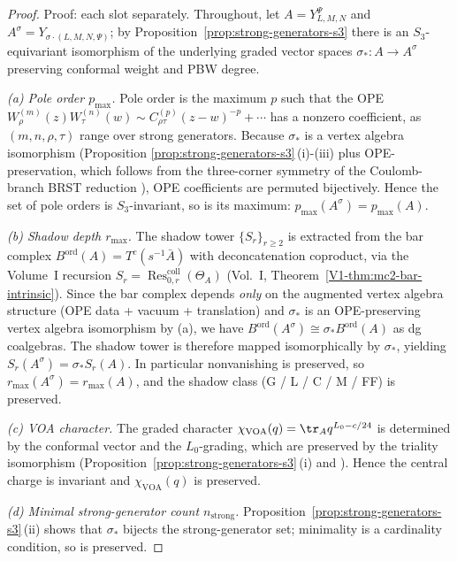 \begin{proof}
Proof: each slot separately. Throughout, let
$A = Y_{L,M,N}^\Psi$ and
$A^\sigma = Y_{\sigma\cdot(L,M,N,\Psi)}$;
by Proposition~\ref{prop:strong-generators-s3} there is an
$S_3$-equivariant isomorphism of the underlying graded vector spaces
$\sigma_*: A \to A^\sigma$ preserving conformal weight and PBW
degree.

\smallskip
\emph{(a) Pole order $p_{\max}$.} Pole order is the maximum
$p$ such that the OPE $W^{(m)}_\rho(z) W^{(n)}_\tau(w) \sim
C_{\rho\tau}^{(p)} (z-w)^{-p} + \dotsb$ has a nonzero coefficient, as
$(m, n, \rho, \tau)$ range over strong generators. Because
$\sigma_*$ is a vertex algebra isomorphism (Proposition
\ref{prop:strong-generators-s3}\,(i)-(iii) plus OPE-preservation, which
follows from the three-corner symmetry of the Coulomb-branch BRST
reduction \cite[\S5]{ProchazkRapcak2018}), OPE coefficients are
permuted bijectively. Hence the set of pole orders is
$S_3$-invariant, so is its maximum: $p_{\max}(A^\sigma) = p_{\max}(A)$.

\smallskip
\emph{(b) Shadow depth $r_{\max}$.} The shadow tower
$\{S_r\}_{r \ge 2}$ is extracted from the bar complex
$B^{\mathrm{ord}}(A) = T^c(s^{-1}\bar A)$ with deconcatenation
coproduct, via the Volume~I recursion
$S_r = \operatorname{Res}^{\mathrm{coll}}_{0,r}(\Theta_A)$
(Vol.~I, Theorem~\ref*{V1-thm:mc2-bar-intrinsic}). Since the bar
complex depends \emph{only} on the augmented vertex algebra
structure (OPE data + vacuum + translation) and $\sigma_*$ is an
OPE-preserving vertex algebra isomorphism by (a), we have
$B^{\mathrm{ord}}(A^\sigma) \cong \sigma_* B^{\mathrm{ord}}(A)$
as dg coalgebras. The shadow tower is therefore mapped isomorphically
by $\sigma_*$, yielding $S_r(A^\sigma) = \sigma_* S_r(A)$. In
particular nonvanishing is preserved, so
$r_{\max}(A^\sigma) = r_{\max}(A)$, and the shadow class
(G / L / C / M / FF) is preserved.

\smallskip
\emph{(c) VOA character.} The graded character
$\chi_{\mathrm{VOA}}(q) = \tr_A q^{L_0 - c/24}$
is determined by the conformal vector and the $L_0$-grading, which are
preserved by the triality isomorphism
(Proposition~\ref{prop:strong-generators-s3}\,(i) and
\cite{CreutzigLinshaw2019}). Hence the central charge is invariant
and $\chi_{\mathrm{VOA}}(q)$ is preserved.

\smallskip
\emph{(d) Minimal strong-generator count $n_{\mathrm{strong}}$.}
Proposition~\ref{prop:strong-generators-s3}\,(ii) shows that
$\sigma_*$ bijects the strong-generator set; minimality is a
cardinality condition, so is preserved.


\end{proof}
